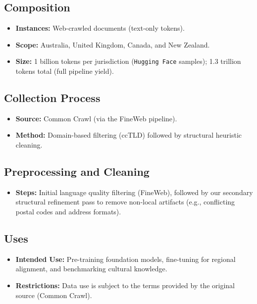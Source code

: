 \documentclass[11pt, a4paper]{article}
\begin{document}
\subsection{Composition}
\begin{itemize}[noitemsep]
    \item \textbf{Instances:} Web-crawled documents (text-only tokens).
    \item \textbf{Scope:} Australia, United Kingdom, Canada, and New Zealand.
    \item \textbf{Size:} 1 billion tokens per jurisdiction (\texttt{Hugging Face} samples); 1.3 trillion tokens total (full pipeline yield).
\end{itemize}

\subsection{Collection Process}
\begin{itemize}[noitemsep]
    \item \textbf{Source:} Common Crawl (via the FineWeb pipeline).
    \item \textbf{Method:} Domain-based filtering (ccTLD) followed by structural heuristic cleaning.
\end{itemize}

\subsection{Preprocessing and Cleaning}
\begin{itemize}[noitemsep]
    \item \textbf{Steps:} Initial language quality filtering (FineWeb), followed by our secondary structural refinement pass to remove non-local artifacts (e.g., conflicting postal codes and address formats).
\end{itemize}

\subsection{Uses}
\begin{itemize}[noitemsep]
    \item \textbf{Intended Use:} Pre-training foundation models, fine-tuning for regional alignment, and benchmarking cultural knowledge.
    \item \textbf{Restrictions:} Data use is subject to the terms provided by the original source (Common Crawl).
\end{itemize}
\end{document}
